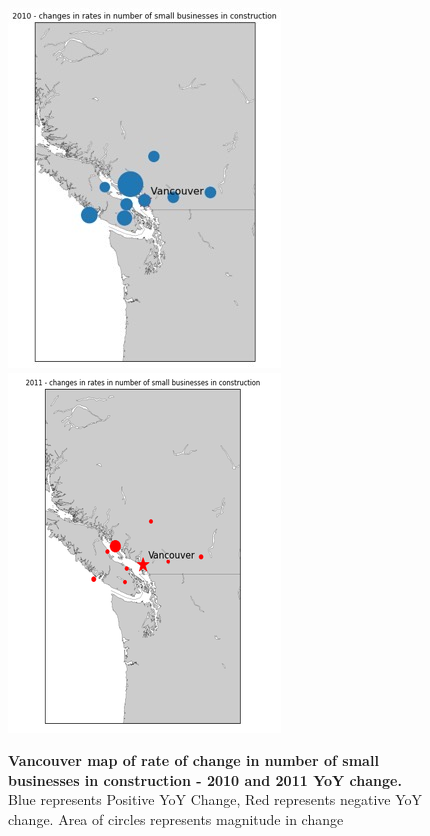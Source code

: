 \documentclass[11pt, twocolumn]{article}
\begin{document}
    \begin{figure}[H]
        \centering
            \includegraphics[scale=0.45]{Vancouver_map_2010.JPG}
            \includegraphics[scale=0.46]{vancouver_map_2011.png}
        \caption{\textbf{Vancouver map of rate of change in number of small businesses in construction - 2010 and 2011 YoY change.} Blue represents Positive YoY Change, Red represents negative YoY change. Area of circles represents magnitude in change}
        \label{fig:Vancouver_map}
    \end{figure}
    
\end{document}
